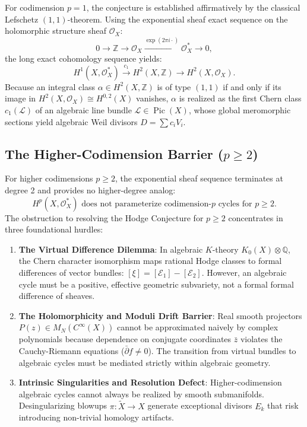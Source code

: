 \documentclass[11pt,reqno]{article}
\theoremstyle{definition}
\DeclareMathOperator{\Pic}{Pic}
\begin{document}
For codimension $p = 1$, the conjecture is established affirmatively by the classical Lefschetz $(1,1)$-theorem. Using the exponential sheaf exact sequence on the holomorphic structure sheaf $\mathcal{O}_X$:
\begin{equation}
0 \longrightarrow \mathbb{Z} \longrightarrow \mathcal{O}_X \xrightarrow{\exp(2\pi i \cdot)} \mathcal{O}_X^* \longrightarrow 0,
\end{equation}
the long exact cohomology sequence yields:
\begin{equation}
H^1(X, \mathcal{O}_X^*) \xrightarrow{c_1} H^2(X, \mathbb{Z}) \longrightarrow H^2(X, \mathcal{O}_X).
\end{equation}
Because an integral class $\alpha \in H^2(X, \mathbb{Z})$ is of type $(1,1)$ if and only if its image in $H^2(X, \mathcal{O}_X) \cong H^{0,2}(X)$ vanishes, $\alpha$ is realized as the first Chern class $c_1(\mathcal{L})$ of an algebraic line bundle $\mathcal{L} \in \Pic(X)$, whose global meromorphic sections yield algebraic Weil divisors $D = \sum c_i V_i$.

\subsection{The Higher-Codimension Barrier ($p \ge 2$)}
For higher codimensions $p \ge 2$, the exponential sheaf sequence terminates at degree 2 and provides no higher-degree analog:
\begin{equation}
H^p(X, \mathcal{O}_X^*) \text{ does not parameterize codimension-}p\text{ cycles for } p \ge 2.
\end{equation}
The obstruction to resolving the Hodge Conjecture for $p \ge 2$ concentrates in three foundational hurdles:
\begin{enumerate}
    \item \textbf{The Virtual Difference Dilemma}: In algebraic $K$-theory $K_0(X) \otimes \mathbb{Q}$, the Chern character isomorphism maps rational Hodge classes to formal differences of vector bundles: $[\xi] = [\mathcal{E}_1] - [\mathcal{E}_2]$. However, an algebraic cycle must be a positive, effective geometric subvariety, not a formal formal difference of sheaves.
    \item \textbf{The Holomorphicity and Moduli Drift Barrier}: Real smooth projectors $P(z) \in M_N(C^\infty(X))$ cannot be approximated naively by complex polynomials because dependence on conjugate coordinates $\bar{z}$ violates the Cauchy-Riemann equations ($\bar{\partial} f \ne 0$). The transition from virtual bundles to algebraic cycles must be mediated strictly within algebraic geometry.
    \item \textbf{Intrinsic Singularities and Resolution Defect}: Higher-codimension algebraic cycles cannot always be realized by smooth submanifolds. Desingularizing blowups $\pi : \tilde{X} \to X$ generate exceptional divisors $E_k$ that risk introducing non-trivial homology artifacts.
\end{enumerate}
\end{document}

